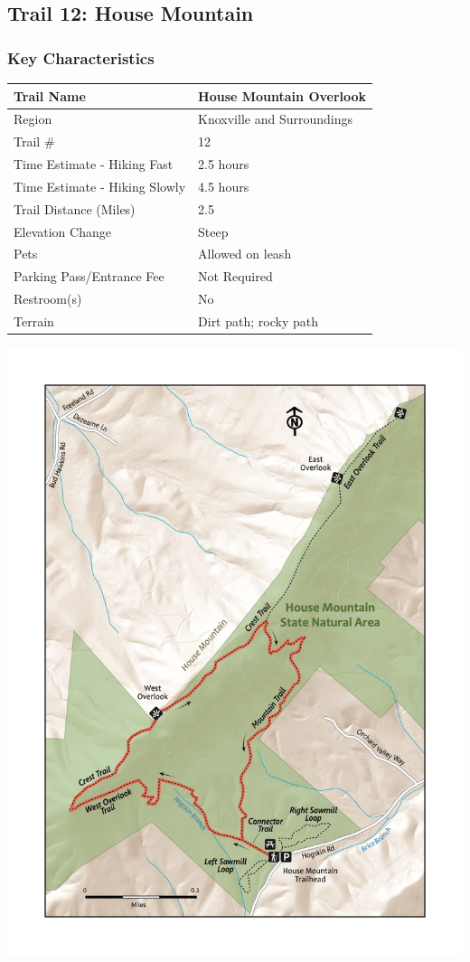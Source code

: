 \documentclass[
  letterpaper,
  DIV=11,
  numbers=noendperiod]{scrartcl}
\begin{document}
\hypertarget{trail-12-house-mountain}{%
\subsection{Trail 12: House Mountain}\label{trail-12-house-mountain}}

\hypertarget{key-characteristics-11}{%
\subsubsection{Key Characteristics}\label{key-characteristics-11}}

\begin{longtable}[]{@{}ll@{}}
\toprule\noalign{}
Trail Name & House Mountain Overlook \\
\midrule\noalign{}
\endhead
\bottomrule\noalign{}
\endlastfoot
Region & Knoxville and Surroundings \\
Trail \# & 12 \\
Time Estimate - Hiking Fast & 2.5 hours \\
Time Estimate - Hiking Slowly & 4.5 hours \\
Trail Distance (Miles) & 2.5 \\
Elevation Change & Steep \\
Pets & Allowed on leash \\
Parking Pass/Entrance Fee & Not Required \\
Restroom(s) & No \\
Terrain & Dirt path; rocky path \\
\end{longtable}

\includegraphics{maps/trail-12-map.jpeg}
\end{document}
